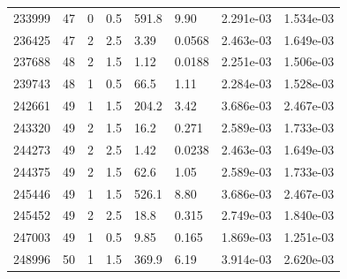 \documentclass[preview]{standalone}
\begin{document}
{{{\begin{tabular}{L{1.2cm}C{1.2cm} C{0.3cm}C{0.5cm} C{1.4cm}C{1.4cm} C{1.4cm}C{1.4cm}}
  233999  &    47  & 0     & 0.5 &  591.8  & 9.90  & 2.291e-03 &  1.534e-03   \\ 
  236425  &    47  & 2     & 2.5 &  3.39  & 0.0568  & 2.463e-03 &  1.649e-03   \\ 
  237688  &    48  & 2     & 1.5 &  1.12  & 0.0188  & 2.251e-03 &  1.506e-03   \\ 
  239743  &    48  & 1     & 0.5 &  66.5  & 1.11  & 2.284e-03 &  1.528e-03   \\ 
  242661  &    49  & 1     & 1.5 &  204.2  & 3.42  & 3.686e-03 &  2.467e-03   \\ 
  243320  &    49  & 2     & 1.5 &  16.2  & 0.271  & 2.589e-03 &  1.733e-03   \\ 
  244273  &    49  & 2     & 2.5 &  1.42  & 0.0238  & 2.463e-03 &  1.649e-03   \\ 
  244375  &    49  & 2     & 1.5 &  62.6  & 1.05  & 2.589e-03 &  1.733e-03   \\ 
  245446  &    49  & 1     & 1.5 &  526.1  & 8.80  & 3.686e-03 &  2.467e-03   \\ 
  245452  &    49  & 2     & 2.5 &  18.8  & 0.315  & 2.749e-03 &  1.840e-03   \\ 
  247003  &    49  & 1     & 0.5 &  9.85  & 0.165  & 1.869e-03 &  1.251e-03   \\ 
  248996  &    50  & 1     & 1.5 &  369.9  & 6.19  & 3.914e-03 &  2.620e-03   \\ 
\hline 
\end{tabular} 

}}}
\end{document}
